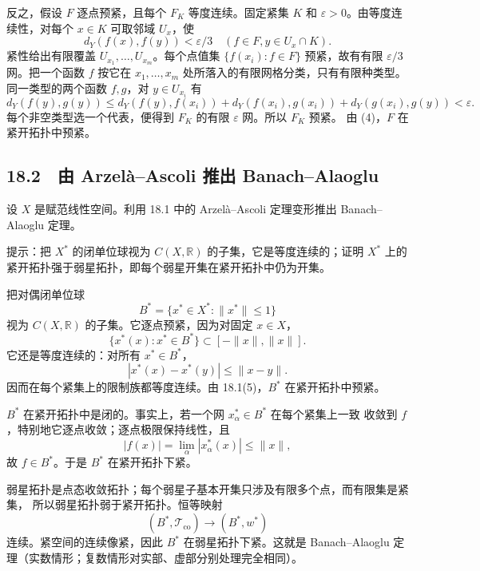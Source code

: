 反之，假设 $F$ 逐点预紧，且每个 $F_K$ 等度连续。固定紧集 $K$ 和
$\varepsilon>0$。由等度连续性，对每个 $x\in K$ 可取邻域 $U_x$，使
\[
 d_Y(f(x),f(y))<\varepsilon/3
 \quad(f\in F, y\in U_x\cap K).
\]
紧性给出有限覆盖 $U_{x_1},\dots,U_{x_m}$。每个点值集
$\{f(x_i):f\in F\}$ 预紧，故有有限 $\varepsilon/3$ 网。把一个函数 $f$ 按它在
$x_1,\dots,x_m$ 处所落入的有限网格分类，只有有限种类型。同一类型的两个函数
$f,g$，对 $y\in U_{x_i}$ 有
\[
 d_Y(f(y),g(y))
 \le d_Y(f(y),f(x_i))+d_Y(f(x_i),g(x_i))+d_Y(g(x_i),g(y))<\varepsilon.
\]
每个非空类型选一个代表，便得到 $F_K$ 的有限 $\varepsilon$ 网。所以 $F_K$ 预紧。
由 (4)，$F$ 在紧开拓扑中预紧。

\subsection*{18.2　由 Arzel\`a--Ascoli 推出 Banach--Alaoglu}

\begin{problem}
设 $X$ 是赋范线性空间。利用 18.1 中的 Arzel\`a--Ascoli 定理变形推出
Banach--Alaoglu 定理。

提示：把 $X^*$ 的闭单位球视为 $C(X,\mathbb R)$ 的子集，它是等度连续的；证明
$X^*$ 上的紧开拓扑强于弱星拓扑，即每个弱星开集在紧开拓扑中仍为开集。
\end{problem}

把对偶闭单位球
\[
 B^*=\{x^*\in X^*:\|x^*\|\le1\}
\]
视为 $C(X,\mathbb R)$ 的子集。它逐点预紧，因为对固定 $x\in X$，
\[
 \{x^*(x):x^*\in B^*\}\subset[-\|x\|,\|x\|].
\]
它还是等度连续的：对所有 $x^*\in B^*$，
\[
 |x^*(x)-x^*(y)|\le\|x-y\|.
\]
因而在每个紧集上的限制族都等度连续。由 18.1(5)，$B^*$ 在紧开拓扑中预紧。

$B^*$ 在紧开拓扑中是闭的。事实上，若一个网 $x_\alpha^*\in B^*$ 在每个紧集上一致
收敛到 $f$，特别地它逐点收敛；逐点极限保持线性，且
\[
 |f(x)|=\lim_\alpha|x_\alpha^*(x)|\le\|x\|,
\]
故 $f\in B^*$。于是 $B^*$ 在紧开拓扑下紧。

弱星拓扑是点态收敛拓扑；每个弱星子基本开集只涉及有限多个点，而有限集是紧集，
所以弱星拓扑弱于紧开拓扑。恒等映射
\[
 (B^*,\mathcal T_{\mathrm{co}})
 \longrightarrow(B^*,w^*)
\]
连续。紧空间的连续像紧，因此 $B^*$ 在弱星拓扑下紧。这就是 Banach--Alaoglu
定理（实数情形；复数情形对实部、虚部分别处理完全相同）。
